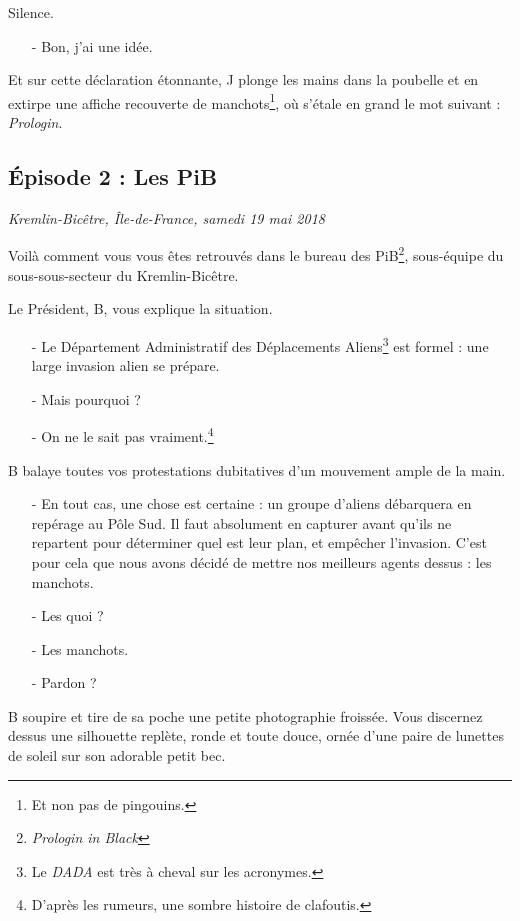Silence.

\begin{itemize}
\item[-] Bon, j'ai une idée.
\end{itemize}

Et sur cette déclaration étonnante, J plonge les mains dans la poubelle et en
extirpe une affiche recouverte de manchots\footnote{Et non pas de pingouins.},
où s'étale en grand le mot suivant : \emph{Prologin}.

\subsection{Épisode 2 : Les PiB}
\hfill \textit{Kremlin-Bicêtre, Île-de-France, samedi 19 mai 2018}

Voilà comment vous vous êtes retrouvés dans le bureau des
PiB\footnote{\emph{Prologin in Black}\texttrademark}, sous-équipe du
sous-sous-secteur du Kremlin-Bicêtre.

Le Président, B, vous explique la situation.

\begin{itemize}
    \item[-] Le Département Administratif des Déplacements Aliens\footnote{Le
        \emph{DADA} est très à cheval sur les acronymes.} est formel : une large
        invasion alien se prépare.
    \item[-] Mais pourquoi ?
    \item[-] On ne le sait pas vraiment.\footnote{D'après les rumeurs, une
        sombre histoire de clafoutis.}
\end{itemize}
B balaye toutes vos protestations dubitatives d'un mouvement ample de la main.
\begin{itemize}
    \item[-] En tout cas, une chose est certaine : un groupe d'aliens débarquera
        en repérage au Pôle Sud. Il faut absolument en capturer avant qu'ils ne
        repartent pour déterminer quel est leur plan, et empêcher l'invasion.
        C'est pour cela que nous avons décidé de mettre nos meilleurs agents
        dessus : les manchots.
    \item[-] Les quoi ?
    \item[-] Les manchots.
    \item[-] Pardon ?
\end{itemize}

B soupire et tire de sa poche une petite photographie froissée. Vous discernez
dessus une silhouette replète, ronde et toute douce, ornée d'une paire de
lunettes de soleil sur son adorable petit bec.

